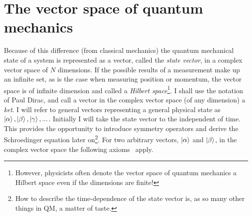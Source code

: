 \section{The vector space of quantum mechanics}
Because of this difference (from classical mechanics) the quantum mechanical state of a system is represented as a vector, called the \emph{state vector}, in a complex vector space of $N$ dimensions. If the possible results of a measurement make up an infinite set, as is the case when measuring position or momentum, the vector space is of infinite dimension and called a \emph{Hilbert space}\footnote{However, physicists often denote the vector space of quantum mechanics a Hilbert space even if the dimensions are finite!}. I shall use the notation of Paul Dirac, and call a vector in the complex vector space (of any dimension) a \emph{ket}. I will refer to general vectors representing a general physical state as $\ket{\alpha},\ket{\beta}, \ket{\gamma},...$. Initially I will take the state vector to the independent of time. This provides the opportunity to introduce symmetry operators and derive the Schroedinger equation later on\footnote{How to describe the time-dependence of the state vector is, as so many other things in QM, a matter of taste.}. For two arbitrary vectors, $\ket{\alpha}$ and $\ket{\beta}$, in the complex vector space the following axioms ~apply\citep{Sakurai}.
